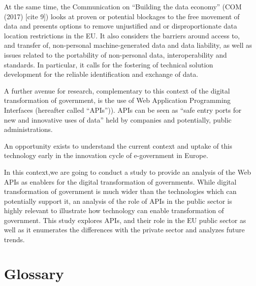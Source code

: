 At the same time, the Communication on “Building the data economy” (COM (2017) [cite 9])
looks at proven or potential blockages to the free movement of data and presents
options to remove unjustified and or disproportionate data location restrictions
in the EU. It also considers the barriers around access to, and transfer of,
non-personal machine-generated data and data liability, as well as issues related
to the portability of non-personal data, interoperability and standards.
In particular, it calls for the fostering of technical solution development for
the reliable identification and exchange of data. 

A further avenue for research, complementary to this context of the digital
transformation of government, is the use of Web Application Programming Interfaces
(hereafter called “APIs”)). APIs can be seen as “safe entry ports for new and
innovative uses of data” held by companies and potentially, public administrations.

An opportunity exists to understand the current context and uptake of this technology
early in the innovation cycle of e-government in Europe.

In this context,we are going to conduct a study to provide an analysis of the
Web APIs as enablers for the digital transformation of governments. While
digital transformation of government is much wider than the technologies which
can potentially support it, an analysis of the role of APIs in the public sector
is highly relevant to illustrate how technology can enable transformation of
government. This study explores APIs, and their role in the EU public sector as
well as it enumerates the differences with the private sector and analyzes future
trends.

\clearpage

\section{Glossary} %

